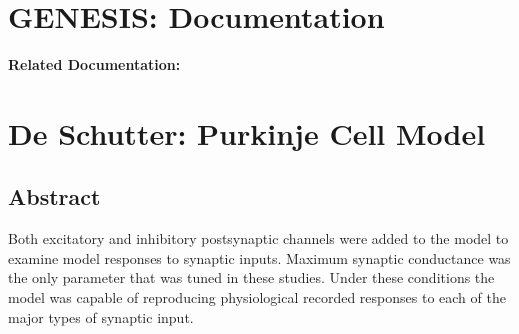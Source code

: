 \documentclass[12pt]{article}
\begin{document}
\section*{GENESIS: Documentation}

{\bf Related Documentation:}

\section*{De Schutter: Purkinje Cell Model}

\subsection*{Abstract}

Both excitatory and inhibitory postsynaptic channels were
added to the model to examine model responses to synaptic
inputs. Maximum synaptic conductance was the only parameter
that was tuned in these studies. Under these
conditions the model was capable of reproducing physiological
recorded responses to each of the major types of synaptic input.
\end{document}
